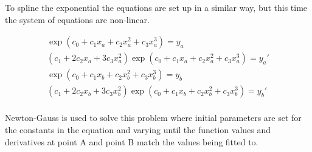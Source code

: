 To spline the exponential the equations are set up in a similar way, but this time the system of equations are non-linear.

\begin{equation}
\begin{split}
\exp(c_0 + c_1 x_a + c_2 x_a^2 + c_3 x_a^3) = y_a \\
(c_1 + 2 c_2 x_a + 3 c_3 x_a^2)\exp(c_0 + c_1 x_a + c_2 x_a^2 + c_3 x_a^3) = y_a' \\
\exp(c_0 + c_1 x_b + c_2 x_b^2 + c_3 x_b^3) = y_b \\
(c_1 + 2 c_2 x_b + 3 c_3 x_b^2)\exp(c_0 + c_1 x_b + c_2 x_b^2 + c_3 x_b^3) = y_b' \\
\end{split}
\label{eq:cubicExpSpline}
\end{equation}

Newton-Gauss is used to solve this problem where initial parameters are set for the constants in the equation and varying until the function values and derivatives at point A and point B match the values being fitted to.


